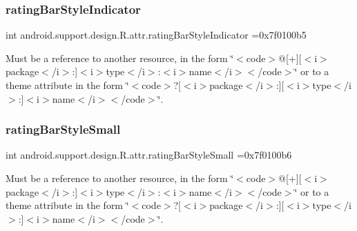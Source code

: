 \subsubsection{\texorpdfstring{rating\+Bar\+Style\+Indicator}{ratingBarStyleIndicator}}
{\footnotesize\ttfamily int android.\+support.\+design.\+R.\+attr.\+rating\+Bar\+Style\+Indicator =0x7f0100b5\hspace{0.3cm}{\ttfamily [static]}}

Must be a reference to another resource, in the form \char`\"{}$<$code$>$@\mbox{[}+\mbox{]}\mbox{[}$<$i$>$package$<$/i$>$\+:\mbox{]}$<$i$>$type$<$/i$>$\+:$<$i$>$name$<$/i$>$$<$/code$>$\char`\"{} or to a theme attribute in the form \char`\"{}$<$code$>$?\mbox{[}$<$i$>$package$<$/i$>$\+:\mbox{]}\mbox{[}$<$i$>$type$<$/i$>$\+:\mbox{]}$<$i$>$name$<$/i$>$$<$/code$>$\char`\"{}. \mbox{\label{classandroid_1_1support_1_1design_1_1R_1_1attr_a5d864933e2126f8bb0abceec75b67646}} 
\subsubsection{\texorpdfstring{rating\+Bar\+Style\+Small}{ratingBarStyleSmall}}
{\footnotesize\ttfamily int android.\+support.\+design.\+R.\+attr.\+rating\+Bar\+Style\+Small =0x7f0100b6\hspace{0.3cm}{\ttfamily [static]}}

Must be a reference to another resource, in the form \char`\"{}$<$code$>$@\mbox{[}+\mbox{]}\mbox{[}$<$i$>$package$<$/i$>$\+:\mbox{]}$<$i$>$type$<$/i$>$\+:$<$i$>$name$<$/i$>$$<$/code$>$\char`\"{} or to a theme attribute in the form \char`\"{}$<$code$>$?\mbox{[}$<$i$>$package$<$/i$>$\+:\mbox{]}\mbox{[}$<$i$>$type$<$/i$>$\+:\mbox{]}$<$i$>$name$<$/i$>$$<$/code$>$\char`\"{}. \mbox{\label{classandroid_1_1support_1_1design_1_1R_1_1attr_a2a3ab85c24fa59afc341f28995a2ad4e}} 
